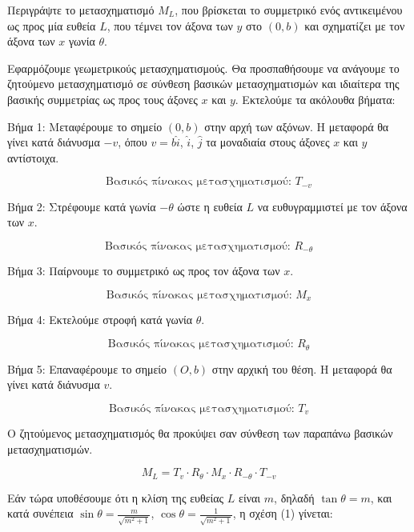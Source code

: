 \begin{example}
Περιγράψτε το μετασχηματισμό $M_L$, που βρίσκεται το συμμετρικό ενός αντικειμένου ως προς μία ευθεία $L$, που τέμνει τον άξονα των $y$ στο $(0,b)$ και σχηματίζει με τον άξονα των $x$ γωνία $\theta$.
\end{example}
\begin{solution}

%

Εφαρμόζουμε γεωμετρικούς μετασχηματισμούς. Θα προσπαθήσουμε να ανάγουμε το ζητούμενο μετασχηματισμό σε σύνθεση βασικών μετασχηματισμών και ιδιαίτερα της βασικής συμμετρίας ως προς τους άξονες $x$ και $y$. Εκτελούμε τα ακόλουθα βήματα:


Βήμα 1:  Μεταφέρουμε το σημείο $(0, b)$ στην αρχή των αξόνων. Η μεταφορά θα γίνει κατά διάνυσμα $-v$, όπου $v = b\hat{i}$, $\hat{i}$, $\hat{j}$ τα μοναδιαία στους άξονες $x$ και $y$ αντίστοιχα.

\[
\text{Βασικός πίνακας μετασχηματισμού: } T_{-v}
\]

Βήμα 2: Στρέφουμε κατά γωνία $-\theta$ ώστε η ευθεία $L$ να ευθυγραμμιστεί με τον άξονα των $x$.

\[
\text{Βασικός πίνακας μετασχηματισμού: } R_{-\theta}
\]

Βήμα 3: Παίρνουμε το συμμετρικό ως προς τον άξονα των $x$.

\[
\text{Βασικός πίνακας μετασχηματισμού: } M_x
\]

Βήμα 4: Εκτελούμε στροφή κατά γωνία $\theta$.

\[
\text{Βασικός πίνακας μετασχηματισμού: } R_\theta
\]

Βήμα 5: Επαναφέρουμε το σημείο $(O, b)$ στην αρχική του θέση. Η μεταφορά θα γίνει κατά διάνυσμα $v$.


\[
\text{Βασικός πίνακας μετασχηματισμού: } T_v
\]

Ο ζητούμενος μετασχηματισμός θα προκύψει σαν σύνθεση των παραπάνω βασικών μετασχηματισμών.

\[
M_L = T_v \cdot R_{\theta} \cdot M_x \cdot R_{-\theta} \cdot T_{-v} \tag{1}
\]

Εάν τώρα υποθέσουμε ότι η κλίση της ευθείας $L$ είναι $m$, δηλαδή $\tan\theta = m$, και κατά συνέπεια $\sin\theta = \frac{m}{\sqrt{m^2+1}}$, $\cos\theta = \frac{1}{\sqrt{m^2+1}}$, η σχέση (1) γίνεται:


\end{solution}

